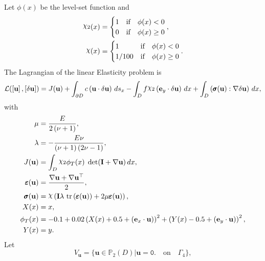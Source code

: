 \documentclass[preview]{standalone}
\let\oldcdot\cdot
\let\cdot\oldcdot
\begin{document}
Let $\phi(x)$ be the level-set function and
 \begin{align*}\raisebox{\depth}{$\chi_2$}(x) &= \begin{cases} 1 & \mbox{if}\quad \phi(x) < 0 \\ 0 & \mbox{if}\quad \phi(x)  \ge 0 \end{cases},\\
\raisebox{\depth}{$\chi$}(x) &= \begin{cases} 1 & \mbox{if}\quad \phi(x) < 0 \\ 1/100 & \mbox{if}\quad \phi(x)  \ge 0 \end{cases}.\end{align*}
The Lagrangian of the linear Elasticity problem is
\begin{dmath*}
\mathcal L(\left[ {\mathbf{ u }}\right],\left[ {\delta\mathbf{  u }}\right]) = J({\mathbf{ u }}) +  \int_{\partial D} c \left( {\mathbf{ u }} \cdot {\delta\mathbf{  u }} \right) \,ds_x -  \int_{D} f \raisebox{\depth}{$\chi_2$} \left( \mathbf e_y \cdot {\delta\mathbf{  u }} \right) \,dx +  \int_{D} \left( \pmb \sigma({\mathbf{ u }}) \mathrel{:}  \nabla {\delta\mathbf{  u }}  \right) \,dx , 
\end{dmath*}
with 
\begin{align*}
\mu &= \frac{E}{2 \left(\nu + 1\right)},\\
\lambda &= - \frac{E \nu}{\left(\nu + 1\right) \left(2 \nu - 1\right)},\\
J({\mathbf{ u }}) &=  \int_{D} \raisebox{\depth}{$\chi_2$} \phi_{T}(x)  \;\operatorname{det}(\mathbf{I} +  \nabla {\mathbf{ u }} )  \,dx,\\
\pmb \varepsilon({\mathbf{ u }}) &= \frac{ \nabla {\mathbf{ u }}  +   \nabla {\mathbf{ u }} ^\top }{2},\\
\pmb \sigma({\mathbf{ u }}) &= \raisebox{\depth}{$\chi$} \left(\mathbf{I} \lambda  \,\operatorname{tr}\left(\pmb \varepsilon({\mathbf{ u }})\right)  + 2 \mu \pmb \varepsilon({\mathbf{ u }})\right),\\
X(x) &= x,\\
\phi_{T}(x) &= -0.1 + 0.02 \left(X(x) + 0.5 + \left( \mathbf e_x \cdot {\mathbf{ u }} \right)\right)^{2} + \left(Y(x) - 0.5 + \left( \mathbf e_y \cdot {\mathbf{ u }} \right)\right)^{2},\\
Y(x) &= y.
 \end{align*}
Let
\begin{equation*}
V_{{\mathbf{ u }}} = \{ {\mathbf{ u }} \in \mathbb P_{2}(D)| {\mathbf{ u }} = \mathtt{\text{0.}}  \quad \text{{on}} \quad\Gamma_{4} \},\end{equation*}
\end{document}
